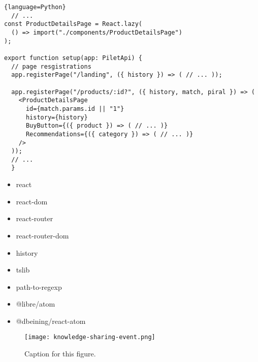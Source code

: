 \begin{lstlisting}{language=Python}
  // ...
const ProductDetailsPage = React.lazy(
  () => import("./components/ProductDetailsPage")
);

export function setup(app: PiletApi) {
  // page resgistrations
  app.registerPage("/landing", ({ history }) => ( // ... ));

  app.registerPage("/products/:id?", ({ history, match, piral }) => (
    <ProductDetailsPage
      id={match.params.id || "1"}
      history={history}
      BuyButton={({ product }) => ( // ... )}
      Recommendations={({ category }) => ( // ... )}
    />
  ));
  // ...
  }
\end{lstlisting}

\begin{itemize}
    \item react
    \item react-dom
    \item react-router
    \item react-router-dom
    \item history
    \item tslib
    \item path-to-regexp
    \item @libre/atom
    \item @dbeining/react-atom
    
\end{itemize}

\begin{figure}[h!]
  \centering
  \captionsetup{justification=centering}
  \texttt{[image: knowledge-sharing-event.png]}
  \caption{Caption for this figure.}
  \label{fig:1}
\end{figure}

